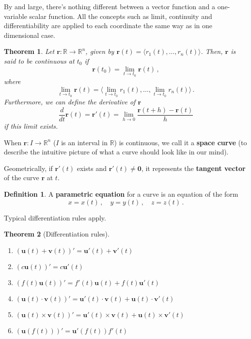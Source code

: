 \documentclass[
]{article}
\newtheorem{theorem}{Theorem}[section]
\theoremstyle{definition}
\newtheorem{definition}{Definition}[section]
\theoremstyle{definition}
\theoremstyle{definition}
\theoremstyle{definition}
\theoremstyle{remark}
\begin{document}
By and large, there's nothing different between a vector function and
a one-variable scalar function.
All the concepts such as limit, continuity and differentiability are applied
to each coordinate the same way as in one dimensional case.

\begin{theorem}
Let \(\mathbf{r}: \mathbb{R}\to \mathbb{R}^n\), given by \(\mathbf{r}(t) = \langle r_1(t), \dots , r_n(t) \rangle\).
Then, \(\mathbf{r}\) is said to be continuous at \(t_0\) if
\begin{equation*}
    \mathbf{r}(t_0) = \lim_{t\to t_0} \mathbf{r}(t) \,,
\end{equation*}
where
\begin{equation*}
    \lim_{t\to t_0} \mathbf{r}(t) = \langle \lim_{t\to t_0}r_1(t) , \dots , \lim_{t\to t_0} r_n(t) \rangle \,. 
\end{equation*}
Furthermore, we can define the derivative of \(\mathbf{r}\)
\begin{equation*}
    \frac{d}{dt} \mathbf{r}(t) = \mathbf{r}'(t) = \lim_{h\to 0} \frac{\mathbf{r}(t+h) - \mathbf{r}(t)}{h} 
\end{equation*}
if this limit exists.
\end{theorem}

When \(\mathbf{r}:I \to \mathbb{R}^n\) (\(I\) is an interval in \(\mathbb{R}\)) is continuous,
we call it a \textbf{space curve} (to describe the intuitive picture of what
a curve should look like in our mind).

Geometrically, if \(\mathbf{r}'(t)\) exists and \(\mathbf{r}'(t) \not= \mathbf{0}\), it
represents the \textbf{tangent vector} of the curve \(\mathbf{r}\) at \(t\).

\begin{definition}
A \textbf{parametric equation} for a curve is an equation of the form
\[
x=x(t)\,, \quad  y = y(t)\,, \quad z = z(t) \,.
\]
\end{definition}

Typical differentiation rules apply.

\begin{theorem}[Differentiation rules]
\leavevmode

\begin{enumerate}
\def\labelenumi{\arabic{enumi}.}
\item
  \((\mathbf{u}(t) + \mathbf{v}(t))' = \mathbf{u}'(t) + \mathbf{v}'(t)\)
\item
  \((c \mathbf{u}(t))' = c \mathbf{u}'(t)\)
\item
  \((f(t) \mathbf{u}(t))' = f'(t) \mathbf{u}(t) + f(t) \mathbf{u}'(t)\)
\item
  \((\mathbf{u}(t) \cdot \mathbf{v}(t))' = \mathbf{u}'(t)\cdot \mathbf{v}(t) + \mathbf{u}(t)\cdot \mathbf{v}'(t)\)
\item
  \((\mathbf{u}(t) \times \mathbf{v}(t))' = \mathbf{u}'(t)\times \mathbf{v}(t) + \mathbf{u}(t)\times \mathbf{v}'(t)\)
\item
  \((\mathbf{u}(f(t)))' = \mathbf{u}'(f(t)) f'(t)\)
\end{enumerate}

\end{theorem}
\end{document}
